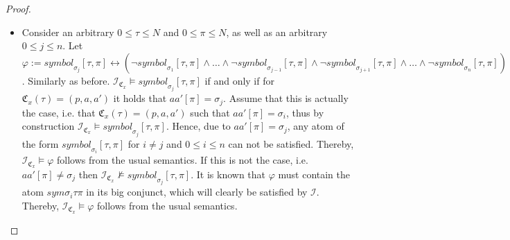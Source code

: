 \documentclass [11pt]{article}
\newcommand{\nmodels}{\not\models}
\newcommand{\sym}[3]{\textit{symbol}_{#1}[#2,#3]}
\newcommand{\sequ}[1]{\mathfrak{C}_{#1}}
\newcommand{\sequint}[2]{ \mathcal{#1}_{\mathfrak{C}_{#2}}}
\begin{document}
\begin{proof}
\begin{itemize}
\item Consider an arbitrary $0\leq \tau \leq N$ and $0 \leq \pi \leq  N$, as well as an arbitrary $0 \leq j \leq n$.
Let $\varphi := \sym{\sigma_j}{\tau}{\pi} \leftrightarrow (\neg \sym{\sigma_1}{\tau}{\pi} \wedge \dots \wedge \neg \sym{\sigma_{j-1}}{\tau}{\pi} \wedge \neg \sym{\sigma_{j+1}}{\tau}{\pi} \wedge \dots \wedge \neg \sym{\sigma_{n}}{\tau}{\pi})$.
Similarly as before. $\sequint{I}{x} \models\sym{\sigma_j}{\tau}{\pi}$ if and only if  for $\sequ{x}(\tau)=(p,a,a')$ it holds that $aa'[\pi]=\sigma_j$. Assume that this is actually the case, i.e. that $\sequ{x}(\tau)=(p,a,a')$ such that $aa'[\pi]=\sigma_i$, thus by construction  $\sequint{I}{x} \models  \sym{\sigma_j}{\tau}{\pi}$. Hence, due to $aa'[\pi]=\sigma_j$, any atom of the form $\sym{\sigma_i}{\tau}{\pi}$ for $i\neq j$ and $0 \leq i \leq n$ can not be satisfied. Thereby, $\sequint{I}{x} \models  \varphi$ follows from the usual semantics.
If this is not the case, i.e. $aa'[\pi]\neq\sigma_j$ then  $\sequint{I}{x} \nmodels  \sym{\sigma_j}{\tau}{\pi}$. It is known that $\varphi$ must contain the atom $sym{\sigma_i}{\tau}{\pi}$ in its big conjunct, which  will clearly be satisfied by $\mathcal{I}$. 
Thereby, $\sequint{I}{x} \models  \varphi $ follows from the usual semantics.
\end{itemize}
\end{proof}
\end{document}
